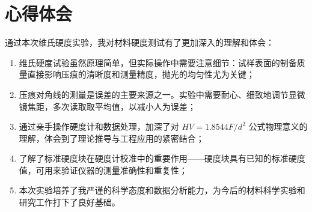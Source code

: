 \section{心得体会}

通过本次维氏硬度实验，我对材料硬度测试有了更加深入的理解和体会：

\begin{enumerate}[label=(\arabic*)]
    \item 维氏硬度试验虽然原理简单，但实际操作中需要注意细节：试样表面的制备质量直接影响压痕的清晰度和测量精度，抛光的均匀性尤为关键；
    \item 压痕对角线的测量是误差的主要来源之一。实验中需要耐心、细致地调节显微镜焦距，多次读取取平均值，以减小人为误差；
    \item 通过亲手操作硬度计和数据处理，加深了对 $HV = 1.8544F/d^2$ 公式物理意义的理解，体会到了理论推导与工程应用的紧密结合；
    \item 了解了标准硬度块在硬度计校准中的重要作用——硬度块具有已知的标准硬度值，可用来验证仪器的测量准确性和重复性；
    \item 本次实验培养了我严谨的科学态度和数据分析能力，为今后的材料科学实验和研究工作打下了良好基础。
\end{enumerate}